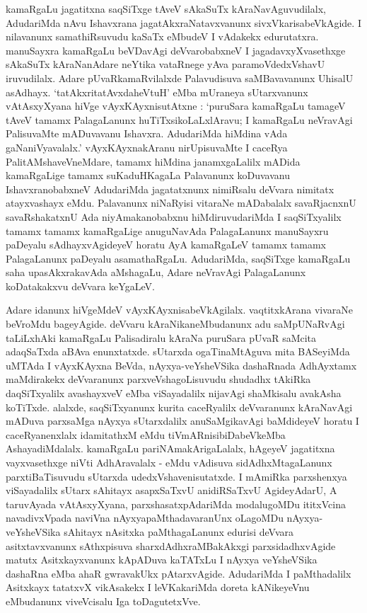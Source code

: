 kamaRgaLu jagatitxna saqSiTxge tAveV sAkaSuTx kAraNavAguvudilalx, AdudariMda nAvu Ishavxrana jagatAkxraNatavxvanunx sivxVkarisabeVkAgide. I nilavanunx samathiRsuvudu kaSaTx eMbudeV I vAdakekx edurutatxra. manuSayxra kamaRgaLu beVDavAgi deVvarobabxneV I jagadavxyXvasethxge sAkaSuTx kAraNanAdare neYtika vataRnege yAva paramoVdedxVshavU iruvudilalx. Adare pUvaRkamaRvilalxde Palavudisuva saMBavavanunx UhisalU asAdhayx. `tatAkxritatAvxdaheVtuH' eMba mUraneya sUtarxvanunx vAtAsxyXyana hiVge vAyxKAyxnisutAtxne : `puruSara kamaRgaLu tamageV tAveV tamamx PalagaLanunx huTiTxsikoLaLxlAravu; I kamaRgaLu neVravAgi PalisuvaMte mADuvavanu Ishavxra. AdudariMda hiMdina vAda gaNaniVyavalalx.' vAyxKAyxnakAranu nirUpisuvaMte I caceRya PalitAMshaveVneMdare, tamamx hiMdina janamxgaLalilx mADida kamaRgaLige tamamx suKaduHKagaLa Palavanunx koDuvavanu IshavxranobabxneV AdudariMda jagatatxnunx nimiRsalu deVvara nimitatx atayxvashayx eMdu. Palavanunx niNaRyisi vitaraNe mADabalalx savaRjacnxnU savaRshakatxnU Ada niyAmakanobabxnu hiMdiruvudariMda I saqSiTxyalilx tamamx tamamx kamaRgaLige anuguNavAda PalagaLanunx manuSayxru paDeyalu sAdhayxvAgideyeV horatu AyA kamaRgaLeV tamamx tamamx PalagaLanunx paDeyalu asamathaRgaLu. AdudariMda, saqSiTxge kamaRgaLu saha upasAkxrakavAda aMshagaLu, Adare neVravAgi PalagaLanunx koDatakakxvu deVvara keYgaLeV.

Adare idanunx hiVgeMdeV vAyxKAyxnisabeVkAgilalx. vaqtitxkArana vivaraNe beVroMdu bageyAgide. deVvaru kAraNikaneMbudanunx adu saMpUNaRvAgi taLiLxhAki kamaRgaLu Palisadiralu kAraNa puruSara pUvaR saMcita adaqSaTxda aBAva enunxtatxde. sUtarxda ogaTinaMtAguva mita BASeyiMda uMTAda I vAyxKAyxna BeVda, nAyxya-veYsheVSika dashaRnada AdhAyxtamx maMdirakekx deVvaranunx parxveVshagoLisuvudu shudadhx tAkiRka daqSiTxyalilx avashayxveV eMba viSayadalilx nijavAgi shaMkisalu avakAsha koTiTxde. alalxde, saqSiTxyanunx kurita caceRyalilx deVvaranunx kAraNavAgi mADuva parxsaMga nAyxya sUtarxdalilx anuSaMgikavAgi baMdideyeV horatu I caceRyanenxlalx idamitathxM eMdu tiVmARnisibiDabeVkeMba AshayadiMdalalx. kamaRgaLu pariNAmakArigaLalalx, hAgeyeV jagatitxna vayxvasethxge niVti AdhAravalalx - eMdu vAdisuva sidAdhxMtagaLanunx parxtiBaTisuvudu sUtarxda udedxVshavenisutatxde. I mAmiRka parxshenxya viSayadalilx sUtarx sAhitayx asapxSaTxvU anidiRSaTxvU AgideyAdarU, A taruvAyada vAtAsxyXyana, parxshasatxpAdariMda modalugoMDu ititxVcina navadivxVpada naviVna nAyxyapaMthadavaranUnx oLagoMDu nAyxya-veYsheVSika sAhitayx nAsitxka paMthagaLanunx edurisi deVvara asitxtavxvanunx sAthxpisuva sharxdAdhxraMBakAkxgi parxsidadhxvAgide matutx Asitxkayxvanunx kApADuva kaTATxLu I nAyxya veYsheVSika dashaRna eMba ahaR gwravakUkx pAtarxvAgide. AdudariMda I paMthadalilx Asitxkayx tatatxvX vikAsakekx I leVKakariMda doreta kANikeyeVnu eMbudanunx viveVcisalu Iga toDagutetxVve.

